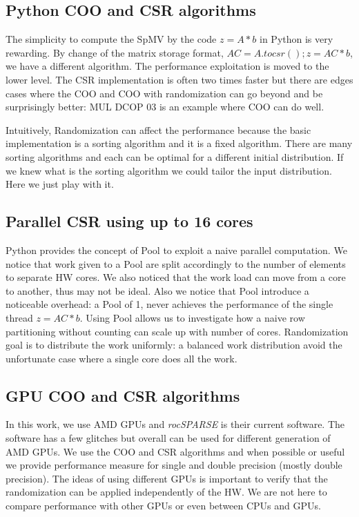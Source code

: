 \documentclass[manuscript,screen]{acmart}
\begin{document}
\subsection{Python COO and CSR algorithms}

The simplicity to compute the SpMV by the code $z = A*b$ in Python is
very rewarding. By change of the matrix storage format, $AC =
A.tocsr(); z = AC*b$, we have a different algorithm. The performance
exploitation is moved to the lower level.  The CSR implementation is
often two times faster but there are edges cases where the COO and COO
with randomization can go beyond and be surprisingly better: MUL DCOP
03 is an example where COO can do well.

Intuitively, Randomization can affect the performance because the
basic implementation is a sorting algorithm and it is a fixed
algorithm. There are many sorting algorithms and each can be optimal
for a different initial distribution. If we knew what is the sorting
algorithm we could tailor the input distribution. Here we just play
with it.

\subsection{Parallel CSR using up to 16 cores}
Python provides the concept of Pool to exploit a naive parallel
computation. We notice that work given to a Pool are split accordingly
to the number of elements to separate HW cores. We also noticed that
the work load can move from a core to another, thus may not be
ideal. Also we notice that Pool introduce a noticeable overhead: a
Pool of 1, never achieves the performance of the single thread $z =
AC*b$. Using Pool allows us to investigate how a naive row
partitioning without counting can scale up with number of
cores. Randomization goal is to distribute the work uniformly: a
balanced work distribution avoid the unfortunate case where a single
core does all the work.


\subsection{GPU COO and CSR algorithms}
In this work, we use AMD GPUs and {\em rocSPARSE} is their current
software. The software has a few glitches but overall can be used for
different generation of AMD GPUs. We use the COO and CSR algorithms
and when possible or useful we provide performance measure for single
and double precision (mostly double precision). The ideas of using
different GPUs is important to verify that the randomization can be
applied independently of the HW. We are not here to compare
performance with other GPUs or even between CPUs and GPUs.
\end{document}
